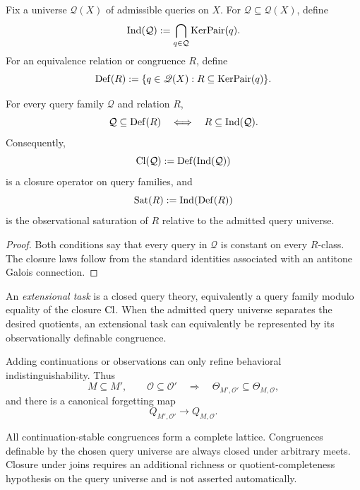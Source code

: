 Fix a universe \(\mathscr Q(X)\) of admissible queries on \(X\).  For \(\mathcal Q\subseteq\mathscr Q(X)\), define
\[
 \operatorname{Ind}(\mathcal Q)
 :=
 \bigcap_{q\in\mathcal Q}\operatorname{KerPair}(q).
\]
For an equivalence relation or congruence \(R\), define
\[
 \operatorname{Def}(R)
 :=
 \{q\in\mathscr Q(X):R\subseteq\operatorname{KerPair}(q)\}.
\]

\begin{theorem}
\label{thm:block17-task-galois}
For every query family \(\mathcal Q\) and relation \(R\),
\[
 \mathcal Q\subseteq\operatorname{Def}(R)
 \quad\Longleftrightarrow\quad
 R\subseteq\operatorname{Ind}(\mathcal Q).
\]
Consequently,
\[
 \operatorname{Cl}(\mathcal Q):=\operatorname{Def}(\operatorname{Ind}(\mathcal Q))
\]
is a closure operator on query families, and
\[
 \operatorname{Sat}(R):=\operatorname{Ind}(\operatorname{Def}(R))
\]
is the observational saturation of \(R\) relative to the admitted query universe.
\end{theorem}

\begin{proof}
Both conditions say that every query in \(\mathcal Q\) is constant on every \(R\)-class.  The closure laws follow from the standard identities associated with an antitone Galois connection.
\end{proof}

\begin{definition}
\label{def:block17-extensional-task}
An \emph{extensional task} is a closed query theory, equivalently a query family modulo equality of the closure \(\operatorname{Cl}\).  When the admitted query universe separates the desired quotients, an extensional task can equivalently be represented by its observationally definable congruence.
\end{definition}

\begin{corollary}
\label{cor:block17-task-strengthening}
Adding continuations or observations can only refine behavioral indistinguishability.  Thus
\[
 M\subseteq M',\qquad \mathcal O\subseteq\mathcal O'
 \quad\Longrightarrow\quad
 \Theta_{M',\mathcal O'}\subseteq\Theta_{M,\mathcal O},
\]
and there is a canonical forgetting map
\[
 Q_{M',\mathcal O'}\longrightarrow Q_{M,\mathcal O}.
\]
\end{corollary}

\begin{boundary}
\label{bnd:block17-task-lattice}
All continuation-stable congruences form a complete lattice.  Congruences definable by the chosen query universe are always closed under arbitrary meets.  Closure under joins requires an additional richness or quotient-completeness hypothesis on the query universe and is not asserted automatically.
\end{boundary}

